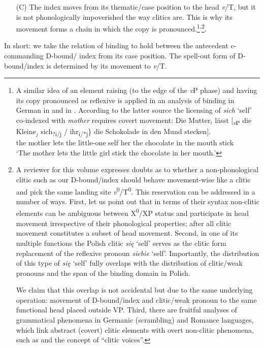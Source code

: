 \documentclass[output=paper,modfonts,nonflat
]{langsci/langscibook}
\begin{document}
\begin{itemize}
    \item[(C)] The index moves from its thematic/case position to the head \textit{v}/T, but it is not phonologically impoverished the way clitics are. This is why its movement forms a chain in which the copy is pronounced.\footnote{\label{fn7}A similar idea of an element raising (to the edge of the \textit{v}P phase) and having its copy pronounced as reflexive is applied in an analysis of binding in German in \cite{safir2004} and in \cite[291]{leeschoenfeld2008}. According to the latter source the licensing of \textit{sich} ‘self’ co-indexed with \textit{mother} requires covert movement:
\ea
\gll Die Mutter$_i$ lässt [\textsubscript{\textit{v}P} die Kleine$_j$ \minsp{\{} sich\textsubscript{?i/j} / ihr\textsubscript{i/*j}\} die Schokolade in den Mund stecken].\\
the mother lets {} the little-one {} self {} her the chocolate in the mouth stick\\
\glt `The mother lets the little girl stick the chocolate in her mouth.’
\z}\textsuperscript{,}\footnote{\label{fn8}A reviewer for this volume expresses doubts as to whether a non-phonological clitic such as our D-bound/index should behave movement-wise like a clitic and pick the same landing site \textit{v}\textsuperscript{0}/T\textsuperscript{0}. This reservation can be addressed in a number of ways. First, let us point out that in terms of their syntax non-clitic elements can be ambiguous between X\textsuperscript{0}/XP status and participate in head movement irrespective of their phonological properties; after all clitic movement constitutes a subset of head movement. Second, in one of its multiple functions the Polish clitic \textit{się} ‘self’ serves as the clitic form replacement of the reflexive pronoun \textit{siebie} ‘self’. Importantly, the distribution of this type of \textit{się} ‘self’ fully overlaps with the distribution of clitic/weak pronouns and the span of the binding domain in Polish.

We claim that this overlap is not accidental but due to the same underlying operation: movement of D-bound/index and clitic/weak pronoun to the same functional head placed outside VP. Third, there are fruitful analyses of grammatical phenomena in Germanic (scrambling) and Romance languages, which link abstract (covert) clitic elements with overt non-clitic phenomena, such as \cite{sportiche1996} and the concept of ``clitic voices''.}.   
\end{itemize}

In short: we take the relation of binding to hold between the antecedent c-commanding D-bound/ index from its case position. The spell-out form of D-bound/index is determined by its movement to \textit{v}/T.
\end{document}
